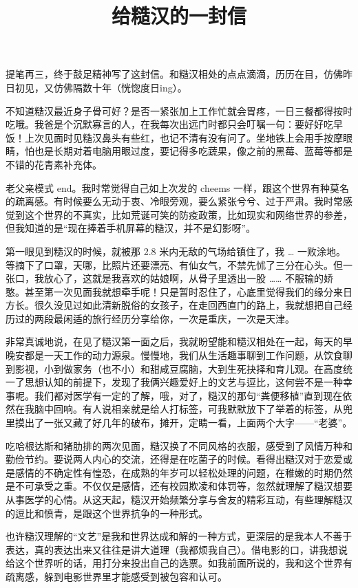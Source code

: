 \documentclass[a4paper, zihao=-4,utf8]{ctexart}
\title{给糙汉的一封信}
\begin{document}
\maketitle
提笔再三，终于鼓足精神写了这封信。和糙汉相处的点点滴滴，历历在目，仿佛昨日初见，又仿佛隔数十年（恍惚度日ing）。

不知道糙汉最近身子骨可好？是否一紧张加上工作忙就会胃疼，一日三餐都得按时吃哦。我爸是个沉默寡言的人，在我每次出远门时都只会叮嘱一句：要好好吃早饭！上次见面时见糙汉鼻头有些红，也记不清有没有问了。坐地铁上会用手按摩眼睛，怕也是长期对着电脑用眼过度，要记得多吃蔬果，像之前的黑莓、蓝莓等都是不错的花青素补充体。

老父亲模式 end。我时常觉得自己如上次发的 cheems 一样，跟这个世界有种莫名的疏离感。有时候要么无动于衷、冷眼旁观，要么紧张兮兮、过于严肃。我时常感觉到这个世界的不真实，比如荒诞可笑的防疫政策，比如现实和网络世界的参差，但我知道的是“现在捧着手机屏幕的糙汉，并不是幻影呀”。

第一眼见到糙汉的时候，就被那 2.8 米内无敌的气场给镇住了，我 … 一败涂地。等摘下了口罩，天哪，比照片还要漂亮、有仙女气，不禁先怵了三分在心头。但一张口，我放心了，这就是我喜欢的姑娘啊，从骨子里透出一股 …… 不服输的娇憨。甚至第一次见面我就想牵手呢！只是暂时忍住了，心底里觉得我们的缘分来日方长。很久没见过如此清新脱俗的女孩子，在走回西直门的路上，我就想把自己经历过的两段最闲适的旅行经历分享给你，一次是重庆，一次是天津。

非常真诚地说，在见了糙汉第一面之后，我就盼望能和糙汉相处在一起，每天的早晚安都是一天工作的动力源泉。慢慢地，我们从生活趣事聊到工作问题，从饮食聊到影视，小到做家务（也不小）和甜咸豆腐脑，大到生死抉择和育儿观。在高度统一了思想认知的前提下，发现了我俩兴趣爱好上的文艺与逗比，这何尝不是一种幸事呢。我们都对医学有一定的了解，哦，对了，糙汉的那句“粪便移植”直到现在依然在我脑中回响。有人说相亲就是给人打标签，可我默默放下了举着的标签，从兜里摸出了一张又藏了好几年的破布，摊开，定睛一看，上面两个大字——“老婆”。

吃哈根达斯和猪肋排的两次见面，糙汉换了不同风格的衣服，感受到了风情万种和勤俭节约。要说两人内心的交流，还得是在吃菌子的时候。看得出糙汉对于恋爱或是感情的不确定性有惶恐，在成熟的年岁可以轻松处理的问题，在稚嫩的时期仍然是不可承受之重。不仅仅是感情，还有校园欺凌和体罚等，忽然就理解了糙汉想要从事医学的心情。从这天起，糙汉开始频繁分享与舍友的精彩互动，有些理解糙汉的逗比和愤青，是跟这个世界抗争的一种形式。

也许糙汉理解的“文艺”是我和世界达成和解的一种方式，更深层的是我本人不善于表达，真的表达出来又往往是讲大道理（我都烦我自己）。借电影的口，讲我想说给这个世界听的话，用打分来投出自己的选票。如我前面所说的，我和这个世界有疏离感，躲到电影世界里才能感受到被包容和认可。
\end{document}
